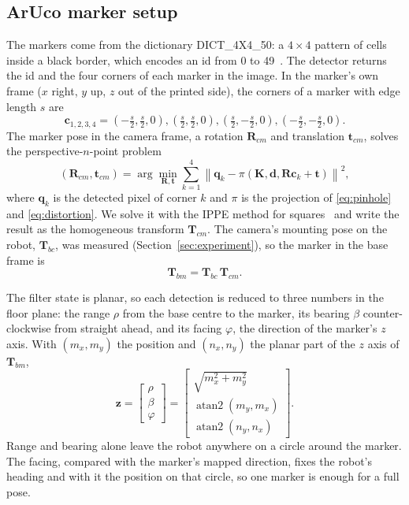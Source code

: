 \documentclass[conference]{IEEEtran}
\newcommand{\vect}[1]{\boldsymbol{#1}}
\begin{document}
\subsection{ArUco marker setup}
The markers come from the dictionary DICT\_4X4\_50: a $4 \times 4$ pattern of cells inside a black border, which encodes an id from 0 to 49~\cite{garrido2014}. The detector returns the id and the four corners of each marker in the image. In the marker's own frame ($x$ right, $y$ up, $z$ out of the printed side), the corners of a marker with edge length $s$ are
\begin{equation}
\vect{c}_{1,2,3,4} = \left(-\tfrac{s}{2}, \tfrac{s}{2}, 0\right), \left(\tfrac{s}{2}, \tfrac{s}{2}, 0\right), \left(\tfrac{s}{2}, -\tfrac{s}{2}, 0\right), \left(-\tfrac{s}{2}, -\tfrac{s}{2}, 0\right).
\label{eq:corners}
\end{equation}
The marker pose in the camera frame, a rotation $\vect{R}_{cm}$ and translation $\vect{t}_{cm}$, solves the perspective-$n$-point problem
\begin{equation}
(\vect{R}_{cm}, \vect{t}_{cm}) = \arg\min_{\vect{R}, \vect{t}} \sum_{k=1}^{4} \left\| \vect{q}_k - \pi\!\left(\vect{K}, \vect{d}, \vect{R}\vect{c}_k + \vect{t}\right) \right\|^2,
\label{eq:pnp}
\end{equation}
where $\vect{q}_k$ is the detected pixel of corner $k$ and $\pi$ is the projection of \eqref{eq:pinhole} and \eqref{eq:distortion}. We solve it with the IPPE method for squares~\cite{collins2014} and write the result as the homogeneous transform $\vect{T}_{cm}$. The camera's mounting pose on the robot, $\vect{T}_{bc}$, was measured (Section~\ref{sec:experiment}), so the marker in the base frame is
\begin{equation}
\vect{T}_{bm} = \vect{T}_{bc}\, \vect{T}_{cm}.
\label{eq:base}
\end{equation}

The filter state is planar, so each detection is reduced to three numbers in the floor plane: the range $\rho$ from the base centre to the marker, its bearing $\beta$ counter-clockwise from straight ahead, and its facing $\varphi$, the direction of the marker's $z$ axis. With $(m_x, m_y)$ the position and $(n_x, n_y)$ the planar part of the $z$ axis of $\vect{T}_{bm}$,
\begin{equation}
\vect{z} = \begin{bmatrix} \rho \\ \beta \\ \varphi \end{bmatrix} =
\begin{bmatrix} \sqrt{m_x^2 + m_y^2} \\ \operatorname{atan2}(m_y, m_x) \\ \operatorname{atan2}(n_y, n_x) \end{bmatrix}.
\label{eq:measurement}
\end{equation}
Range and bearing alone leave the robot anywhere on a circle around the marker. The facing, compared with the marker's mapped direction, fixes the robot's heading and with it the position on that circle, so one marker is enough for a full pose.
\end{document}
